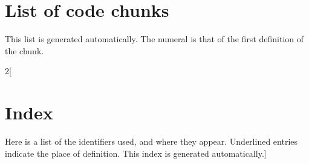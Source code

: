 \section*{List of code chunks}
This list is generated automatically. The numeral is that of the first
definition of the chunk.
\nowebchunks
\begin{multicols}{2}[\section*{Index}
Here is a list of the identifiers used, and where they appear.
Underlined entries indicate the place of definition.
This index is generated automatically.]
\nowebindex
\end{multicols}










\nwenddocs{}
